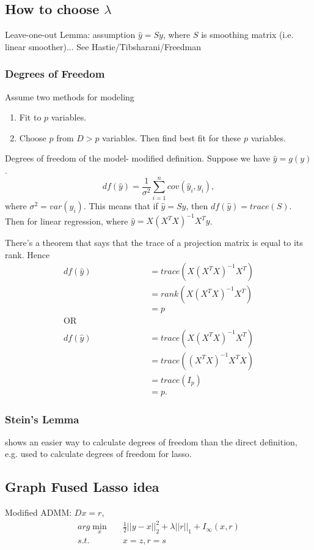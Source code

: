 \documentclass{article}
\begin{document}
\subsection{How to choose $\lambda$}

Leave-one-out Lemma: assumption $\hat{y} = Sy$, where $S$ is smoothing matrix (i.e. linear smoother)... See Hastie/Tibsharani/Freedman

\subsubsection{Degrees of Freedom}
Assume two methods for modeling
\begin{enumerate}
\item  Fit to $p$ variables. 
\item Choose $p$ from $D>p$ variables. Then find best fit for these $p$ variables. 
\end{enumerate}

Degrees of freedom of the model- modified definition. 
Suppose we have $\hat{y} = g(y)$. 
$$
df(\hat{y}) = \frac{1}{\sigma^2} \sum_{i=1}^n cov(\hat{y}_i, y_i),
$$ where $\sigma^2 = var(y_i)$.  This means that if $\hat{y} = Sy$, then $df(\hat{y}) = trace(S)$. Then for linear regression, where $\hat{y} = X(X^TX)^{-1}X^Ty$. 

There's a theorem that says that the trace of a projection matrix is equal to its rank. Hence 
\begin{align*}
df(\hat{y}) &= trace(X(X^TX)^{-1}X^T) \\
&= rank(X(X^TX)^{-1}X^T) \\
&= p\\
\text{OR } \phantom{asd;lfkja;sldfkj}\\
df(\hat{y}) & = trace(X(X^TX)^{-1}X^T) \\
&= trace((X^TX)^{-1}X^TX) \\
&= trace(I_p)\\
& = p.
\end{align*}

\subsubsection{Stein's Lemma}
shows an easier way to calculate degrees of freedom than the direct definition, e.g. used to calculate degrees of freedom for lasso. 

\subsection{Graph Fused Lasso idea}
Modified ADMM: $Dx = r$, 
\begin{eqnarray*}
arg \min_x &&\frac{1}{2}|| y - x ||^2_2 + \lambda||r||_1 + I_\infty(x,r)\\
s.t. && x = z, r = s
\end{eqnarray*}
\end{document}
